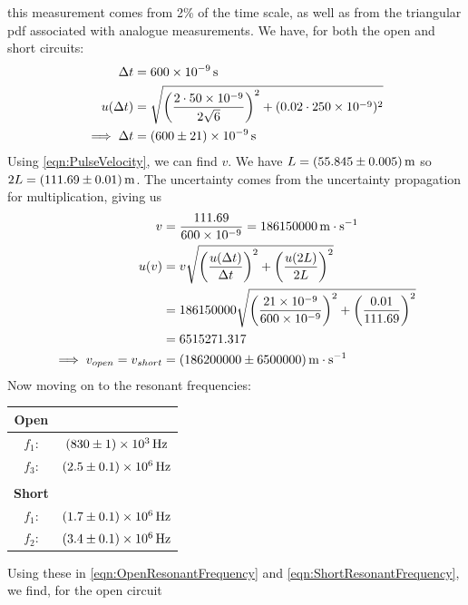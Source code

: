 \documentclass[12pt]{article}
\numberwithin{equation}{section}
\numberwithin{figure}{section}
\begin{document}
    this measurement comes from 2\% of the time scale, as well as from the triangular pdf 
    associated with analogue measurements. We have, for both the open and short circuits:
    \begin{align*}
        \Delta t&=\SI{600e-9}{\second}\\
        u(\Delta t)&=\sqrt{\left(\frac{2\cdot \num{50e-9}}{2\sqrt{6}}\right)^2 + (0.02\cdot \num{250e-9})^2}\\
        \implies \Delta t&=\SI{600\pm21e-9}{\second}
    \end{align*}
    Using \autoref{eqn:PulseVelocity}, we can find $v$. We have $L=\SI{55.845\pm0.005}{\metre}$ so 
    $2L=\SI{111.69\pm0.01}{\metre}$. The uncertainty comes from the uncertainty propagation for 
    multiplication, giving us
    \begin{align*}
        v&=\frac{111.69}{\num{600e-9}}=\SI{186150000}{\metre\cdot\second^{-1}}\\
        u(v)&=v\sqrt{\left(\frac{u(\Delta t)}{\Delta t}\right)^2 + \left(\frac{u(2L)}{2L}\right)^2}\\
        &=186150000\sqrt{\left(\frac{\num{21e-9}}{\num{600e-9}}\right)^2 + \left(\frac{0.01}{111.69}\right)^2}\\
        &=6515271.317\\
        \implies v_{open}=v_{short}&=\SI{186200000\pm6500000}{\metre\cdot\second^{-1}}
    \end{align*}
    \newline
    Now moving on to the resonant frequencies:
    \begin{table}[H]
        \centering
        \begin{tabular}{c c}
            \textbf{Open} & \\
            \hline
            $f_1$: & $\SI{830\pm1e3}{\hertz}$\\
            $f_3$: & $\SI{2.5\pm0.1e6}{\hertz}$\\
            \hspace{3pt} & \\
            \textbf{Short} & \\
            \hline
            $f_1$: & $\SI{1.7\pm0.1e6}{\hertz}$\\
            $f_2$: & $\SI{3.4\pm0.1e6}{\hertz}$
        \end{tabular}
    \end{table}
    \noindent
    Using these in \autoref{eqn:OpenResonantFrequency} and \autoref{eqn:ShortResonantFrequency}, 
    we find, for the open circuit 
\end{document}
